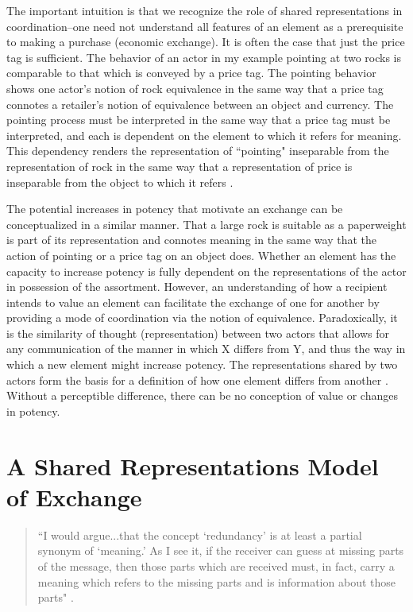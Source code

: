 The important intuition is that we recognize the role of shared representations in coordination--one need not understand all features of an element as a prerequisite to making a purchase (economic exchange). It is often the case that just the price tag is sufficient. The behavior of an actor in my example pointing at two rocks is comparable to that which is conveyed by a price tag. The pointing behavior shows one actor's notion of rock equivalence in the same way that a price tag connotes a retailer's notion of equivalence between an object and currency. The pointing process must be interpreted in the same way that a price tag must be interpreted, and each is dependent on the element to which it refers for meaning. This dependency renders the representation of ``pointing" inseparable from the representation of rock in the same way that a representation of price is inseparable from the object to which it refers \citep{erickson1985}. 

The potential increases in potency that motivate an exchange can be conceptualized in a similar manner. That a large rock is suitable as a paperweight is part of its representation and connotes meaning in the same way that the action of pointing or a price tag on an object does. Whether an element has the capacity to increase potency is fully dependent on the representations of the actor in possession of the assortment. However, an understanding of how a recipient intends to value an element can facilitate the exchange of one for another by providing a mode of coordination via the notion of equivalence. Paradoxically, it is the similarity of thought (representation) between two actors that allows for any communication of the manner in which X differs from Y, and thus the way in which a new element might increase potency. The representations shared by two actors form the basis for a definition of how one element differs from another \citep{humphreys2010}. Without a perceptible difference, there can be no conception of value or changes in potency. 

\section{A Shared Representations Model of Exchange\label{ent}}
\begin{small}
\begin{quote}
 ``I would argue...that the concept `redundancy' is at least a partial synonym of `meaning.' As I see it, if the receiver can guess at missing parts of the message, then those parts which are received must, in fact, carry a meaning which refers to the missing parts and is information about those parts" \citep[p. 420]{bateson1972}.
 \end{quote}
 \end{small}
 
